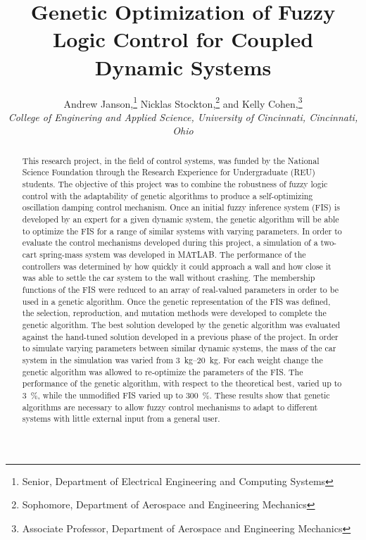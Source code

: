 \documentclass[submit]{aiaa-tc}%
\title{Genetic Optimization of Fuzzy Logic Control for Coupled Dynamic Systems}
\author{
  Andrew Janson,\thanks{Senior, Department of Electrical Engineering and Computing Systems}\quad 
  Nicklas Stockton,\thanks{Sophomore, Department of Aerospace and Engineering Mechanics}\quad 
  and Kelly Cohen,\thanks{Associate Professor, Department of Aerospace and Engineering Mechanics}\\
  {\normalsize\itshape
   College of Enginering and Applied Science, University of Cincinnati, Cincinnati, Ohio}}
\begin{document}
\maketitle
{}
\begin{abstract}
This research project, in the field of control systems, was funded by the National Science Foundation through the Research Experience for Undergraduate (REU) students. The objective of this project was to combine the robustness of fuzzy logic control with the adaptability of genetic algorithms to produce a self-optimizing oscillation damping control mechanism. Once an initial fuzzy inference system (FIS) is developed by an expert for a given dynamic system, the genetic algorithm will be able to optimize the FIS for a range of similar systems with varying parameters. In order to evaluate the control mechanisms developed during this project, a simulation of a two-cart spring-mass system was developed in MATLAB. The performance of the controllers was determined by how quickly it could approach a wall and how close it was able to settle the car system to the wall without crashing. The membership functions of the FIS were reduced to an array of real-valued parameters in order to be used in a genetic algorithm. Once the genetic representation of the FIS was defined, the selection, reproduction, and mutation methods were developed to complete the genetic algorithm. The best solution developed by the genetic algorithm was evaluated against the hand-tuned solution developed in a previous phase of the project. In order to simulate varying parameters between similar dynamic systems, the mass of the car system in the simulation was varied from \SIrange{3}{20}{\kilogram}. For each weight change the genetic algorithm was allowed to re-optimize the parameters of the FIS. The performance of the genetic algorithm, with respect to the theoretical best, varied up to \SI{3}{\percent}, while the unmodified FIS varied up to \SI{300}{\percent}. These results show that genetic algorithms are necessary to allow fuzzy control mechanisms to adapt to different systems with little external input from a general user.
\end{abstract}

\printnomenclature
\end{document}
